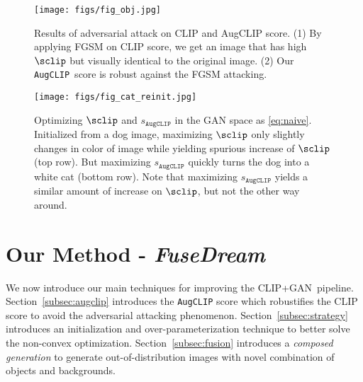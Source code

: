 \documentclass[10pt,twocolumn,letterpaper]{article}
\newcommand{\our}{\emph{FuseDream}}
\newcommand{\ganclip}{CLIP+GAN}
\newcommand{\ourloss}{\texttt{AugCLIP}}
\begin{document}
\begin{figure}
    \centering
    \texttt{[image: figs/fig\_obj.jpg]}
    \caption{Results of adversarial attack on CLIP and AugCLIP score. (1) By applying FGSM on CLIP score, we get an image that has high $\sclip$ but visually identical to the original image. (2) Our \ourloss~score is robust against the FGSM attacking. 
}
    \label{fig:clip_score}
\end{figure}
\begin{figure}
    \centering
    \texttt{[image: figs/fig\_cat\_reinit.jpg]}
    \caption{Optimizing $\sclip$ and $s_{\ourloss}$ in the GAN space as \eqref{eq:naive}.  
    Initialized from a dog image, maximizing $\sclip$ only slightly changes in color of image while yielding spurious increase of $\sclip$ (top row). But maximizing $s_{\ourloss}$  quickly turns the dog into a white cat (bottom row). 
   Note that maximizing $s_{\ourloss}$ yields a similar amount of increase on $\sclip$, but not the other way around. 
}
    \label{fig:augclip_score}
\end{figure}









\section{Our Method - \our}
We now introduce our main techniques 
for improving the \ganclip~pipeline. 
Section~\ref{subsec:augclip} 
introduces the {\ourloss} score which robustifies 
the CLIP score to avoid the adversarial attacking phenomenon. 
Section~\ref{subsec:strategy} 
introduces an initialization and over-parameterization technique 
to better solve the non-convex optimization. 
Section~\ref{subsec:fusion} 
introduces a \emph{composed generation} to generate out-of-distribution images 
with novel combination of objects and backgrounds. 


\iffalse
which incorporates multiple random augmentation into the original CLIP score to relief the mismatch between image quality and optimization score. 
We further analyze a series of design choices in the optimization procedure to get better solutions, 
including an improved initialization strategy and an augmentation of the parameter space.
Finally, we expand the solution space beyond the original latent space of GAN by fusing two images.
To generate natural images upon the fusion operation, 
we propose a novel bi-level optimization problem, and solve it efficiently with a barrier function-based gradient descent algorithm.
\fi
\end{document}
